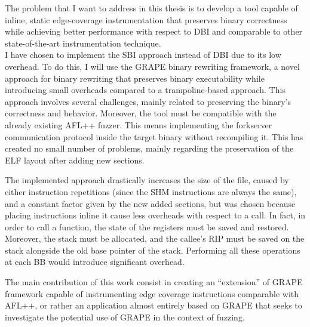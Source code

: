 The problem that I want to address in this thesis is to develop a tool capable of inline, 
static edge-coverage instrumentation that preserves binary correctness while achieving better performance with respect 
to \gls{DBI} and comparable to other state-of-the-art instrumentation technique.\\
I have chosen to implement the \gls{SBI} approach instead of \gls{DBI} due to its low overhead.
To do this, I will use the GRAPE binary rewriting framework, a novel approach for binary rewriting that preserves binary executability
while introducing small overheads compared to a trampoline-based approach.
This approach involves several challenges, mainly related to preserving the binary's correctness and behavior.
Moreover, the tool must be compatible with the already existing AFL++ fuzzer.
This means implementing the forkserver communication protocol inside the target binary without recompiling it.
This has created no small number of problems, mainly regarding the preservation of the ELF layout after adding new sections.

The implemented approach drastically increases the size of the file, caused by either instruction repetitions 
(since the \gls{SHM} instructions are always the same), and a constant factor given by the new added sections, 
but was chosen because placing instructions inline it cause less overheads with respect to a call.
In fact, in order to call a function, the state of the registers must be saved and restored. Moreover, the stack must be allocated,
and the callee's RIP must be saved on the stack alongside the old base pointer of the stack.
Performing all these operations at each \gls{BB} would introduce significant overhead.

The main contribution of this work consist in creating an ``extension'' of GRAPE framework capable of instrumenting 
edge coverage instructions comparable with AFL++, or rather an application almost entirely based on GRAPE that seeks to 
investigate the potential use of GRAPE in the context of fuzzing. 
